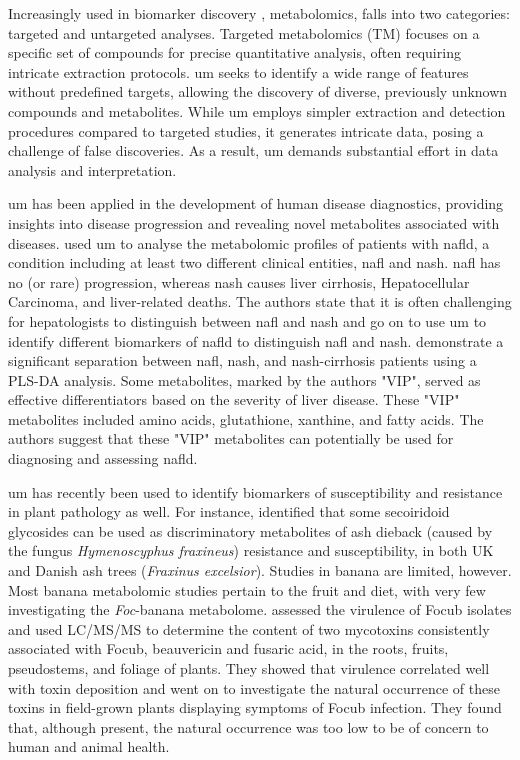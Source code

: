 Increasingly used in biomarker discovery \parencite{Li2016, Dang2018, Chen2023}, metabolomics, falls into two categories: targeted and untargeted analyses. Targeted metabolomics (TM) focuses on a specific set of compounds for precise quantitative analysis, often requiring intricate extraction protocols. \acf{um} seeks to identify a wide range of features without predefined targets, allowing the discovery of diverse, previously unknown compounds and metabolites. While \ac{um} employs simpler extraction and detection procedures compared to targeted studies, it generates intricate data, posing a challenge of false discoveries. As a result, \ac{um} demands substantial effort in data analysis and interpretation.

\ac{um} has been  applied in the development of human disease diagnostics, providing insights into disease progression and revealing novel metabolites associated with diseases. \textcite{Masarone2021} used \ac{um} to analyse the metabolomic profiles of patients with \ac{nafld}, a condition including at least two different clinical entities, \ac{nafl} and \ac{nash}. \ac{nafl} has no (or rare) progression, whereas \ac{nash} causes liver cirrhosis, Hepatocellular Carcinoma, and liver-related deaths. The authors state that it is often challenging for hepatologists to distinguish between \ac{nafl} and \ac{nash} and go on to use \ac{um} to identify different biomarkers of \ac{nafld} to distinguish \ac{nafl} and \ac{nash}. \textcite{Masarone2021} demonstrate a significant separation between \ac{nafl}, \ac{nash}, and \ac{nash}-cirrhosis patients using a PLS-DA analysis. Some metabolites, marked by the authors "VIP", served as effective differentiators based on the severity of liver disease. These "VIP" metabolites included amino acids, glutathione, xanthine, and fatty acids. The authors suggest that these "VIP" metabolites can potentially be used for diagnosing and assessing \ac{nafld}.

\ac{um} has recently been used to identify biomarkers of susceptibility and resistance in plant pathology as well. For instance, \textcite{Sambles2017, Sidda2020} identified that some secoiridoid glycosides can be used as discriminatory metabolites of ash dieback  (caused by the fungus \textit{Hymenoscyphus fraxineus}) resistance and susceptibility,  in both UK and Danish ash trees (\textit{Fraxinus excelsior}). Studies in banana are limited, however. Most banana metabolomic studies pertain to the fruit and diet, with very few investigating the \textit{Foc}-banana metabolome. \parencite{Li2013c} assessed the virulence of \ac{Focub} isolates and used LC/MS/MS to determine the content of two mycotoxins consistently associated with \ac{Focub}, beauvericin and fusaric acid, in the roots, fruits, pseudostems, and foliage of plants. They showed that virulence correlated well with toxin deposition and went on to investigate the natural occurrence of these toxins in field-grown plants displaying symptoms of \ac{Focub} infection. They found that, although present, the natural occurrence was too low to be of concern to human and animal health.

